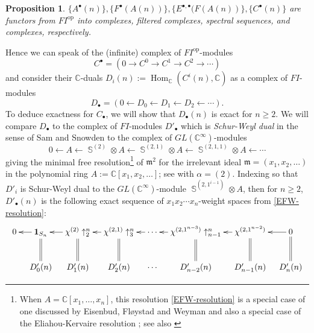 \documentclass[12pt]{amsart}
\theoremstyle{plain}
\newtheorem{prop}[thm]{Proposition}
\theoremstyle{definition}
\begin{document}
\begin{prop} \label{prop:FIop-structure}
$\{A^\bullet(n)\}, 
\{F^\bullet(A(n))\}, 
\{E^{\bullet,\bullet}(F(A(n))\}, 
\{C^\bullet(n)\}
$ 
are functors from $FI^{{\operatorname{op}}}$ into 
complexes, filtered complexes, spectral sequences, and complexes,
respectively.  
\end{prop}

Hence we can speak of the (infinite) complex of $FI^{{\operatorname{op}}}$-modules
$$
C^\bullet=(0 \rightarrow C^0 \rightarrow C^1 \rightarrow C^2 \rightarrow \cdots )
$$
and consider their ${{\mathbb C}}$-duals $D_i(n):={{\operatorname{Hom}}}_{{\mathbb C}}(C^i(n),{{\mathbb C}})$
as a complex of $FI$-modules
$$
D_\bullet=(0 \leftarrow D_0 \leftarrow D_1 \leftarrow D_2 \leftarrow \cdots ).
$$
To deduce exactness for $C_\bullet$, we will
show that $D_\bullet(n)$ is exact for $n \geq 2$.  We will
compare $D_\bullet$ to the complex of $FI$-modules $D'_\bullet$ which is
{\it Schur-Weyl dual} in the sense of Sam and Snowden \cite[\S 1]{symc1} 
to the complex of $GL({{\mathbb C}}^\infty)$-modules 
\begin{equation}
\label{EFW-resolution}
0 \leftarrow 
A \leftarrow 
{{\operatorname{\mathbb{S}}}}^{(2)} \otimes A \leftarrow
{{\operatorname{\mathbb{S}}}}^{(2,1)} \otimes A \leftarrow
{{\operatorname{\mathbb{S}}}}^{(2,1,1)} \otimes A \leftarrow
\cdots 
\end{equation}
giving the minimal free resolution\footnote{When $A={{\mathbb C}}[x_1,\ldots,x_n]$,
this resolution \eqref{EFW-resolution} is a special case
of one discussed by Eisenbud, Fl{\o}ystad and Weyman \cite{EisenbudFloystadWeyman} 
and also a special case of the 
Eliahou-Kervaire resolution \cite{EliahouKervaire};
see also \cite[\S 2.3]{MillerSturmfels}} of ${{\mathfrak{m}}}^2$ for 
the irrelevant ideal ${{\mathfrak{m}}}=(x_1,x_2,\ldots)$
in the polynomial ring $A:={{\mathbb C}}[x_1,x_2,\ldots]$; 
see \cite[Example 6.10]{symc1} with $\alpha=(2)$.
Indexing so that $D'_i$ is Schur-Weyl dual 
to the $GL({{\mathbb C}}^\infty)$-module ${{\operatorname{\mathbb{S}}}}^{(2,1^{i-1})} \otimes A$,
then for $n \geq 2$, $D'_\bullet(n)$ is the following
exact sequence of $x_1 x_2 \cdots x_n$-weight spaces from
\eqref{EFW-resolution}:
\begin{equation}
\label{finite-D'-structure}
\xymatrix@C=0.8pc{
0 
&{{\mathbf{1}}}_{S_n} \ar[l] \ar@{=}[d]
&\chi^{(2)}\uparrow_{2}^{n} \ar[l] \ar@{=}[d]
&\chi^{(2,1)}\uparrow_{3}^{n} \ar[l] \ar@{=}[d]
& \cdots\ar[l]
&\chi^{(2,1^{n-3})}\uparrow_{n-1}^{n} \ar[l] \ar@{=}[d]
&\chi^{(2,1^{n-2})}\ar[l] \ar@{=}[d]
&0 \ar[l] \ar@{=}[d]\\
&D'_0(n)
&D'_1(n)
&D'_2(n)
&\cdots
&D'_{n-2}(n)
&D'_{n-1}(n)
&D'_{n}(n)
}
\end{equation}
\end{document}
